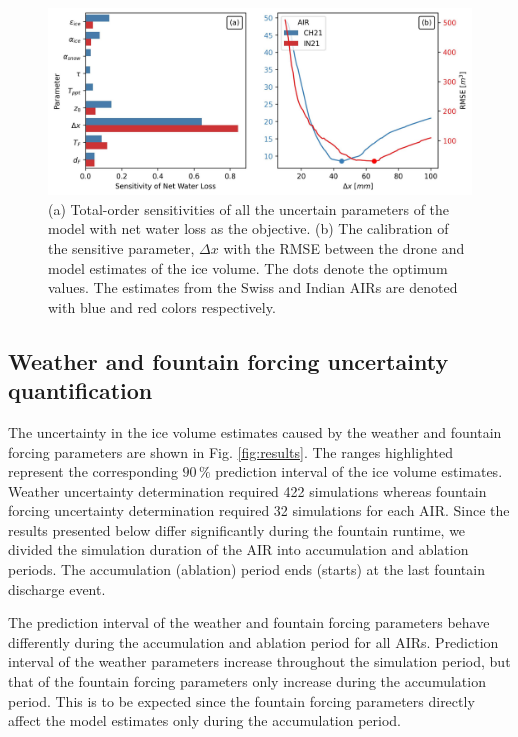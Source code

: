 \documentclass[utf8]{frontiersSCNS}
\begin{document}
\begin{figure}
	\begin{center}
		\includegraphics[width=\linewidth]{Figures/Figure_5.jpg}
	\end{center}
  \caption{(a) Total-order sensitivities of all the uncertain parameters of the model with net water loss as the
  objective. (b) The calibration of the sensitive parameter, $\Delta x$ with the RMSE between the drone and
model estimates of the ice volume. The dots denote the optimum values. The estimates from the Swiss and Indian
AIRs are denoted with blue and red colors respectively. }
	\label{fig:param_hist}
\end{figure}



\subsection{Weather and fountain forcing uncertainty quantification}

The uncertainty in the ice volume estimates caused by the weather and fountain forcing parameters are shown in
Fig. \ref{fig:results}. The ranges highlighted represent the corresponding $90\,\%$ prediction interval of the
ice volume estimates. Weather uncertainty determination required 422 simulations whereas fountain forcing
uncertainty determination required 32 simulations for each AIR. Since the results presented below differ
significantly during the fountain runtime, we divided the simulation duration of the AIR into accumulation and
ablation periods. The accumulation (ablation) period ends (starts) at the last fountain discharge event. 
 

The prediction interval of the weather and fountain forcing parameters behave differently during the
accumulation and ablation period for all AIRs. Prediction interval of the weather parameters increase
throughout the simulation period, but that of the fountain forcing parameters only increase during the
accumulation period. This is to be expected since the fountain forcing parameters directly affect the model
estimates only during the accumulation period. 
\end{document}
